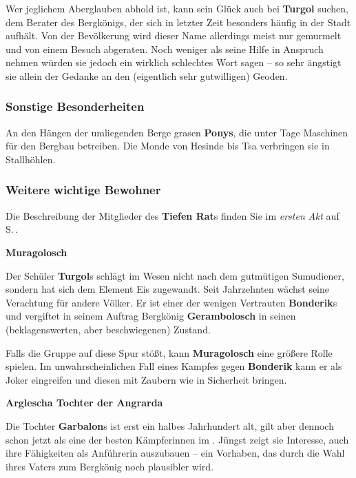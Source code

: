 Wer jeglichem Aberglauben abhold ist, kann sein Glück auch bei \textbf{Turgol} suchen, dem Berater des Bergkönigs, der sich in letzter Zeit besonders häufig in der Stadt aufhält.
Von der Bevölkerung wird dieser Name allerdings meist nur gemurmelt und von einem Besuch abgeraten.
Noch weniger als seine Hilfe in Anspruch nehmen würden sie jedoch ein wirklich schlechtes Wort sagen -- so sehr ängstigt sie allein der Gedanke an den (eigentlich sehr gutwilligen) Geoden.

\subsubsection{Sonstige Besonderheiten}
An den Hängen der umliegenden Berge grasen \textbf{Ponys}, die unter Tage Maschinen für den Bergbau betreiben. Die Monde von Hesinde bis Tsa verbringen sie in Stallhöhlen.


\subsubsection{Weitere wichtige Bewohner}

Die Beschreibung der Mitglieder des \textbf{Tiefen Rat}s finden Sie im \emph{ersten Akt} auf S.\,\pageref{rat}. 

\bigskip

\textbf{Muragolosch}

Der Schüler \textbf{Turgol}s schlägt im Wesen nicht nach dem gutmütigen Sumudiener, sondern hat sich dem Element Eis zugewandt.
Seit Jahrzehnten wächst seine Verachtung für andere Völker.
Er ist einer der wenigen Vertrauten \textbf{Bonderik}s und vergiftet in seinem Auftrag Bergkönig \textbf{Gerambolosch} in seinen (beklagenswerten, aber beschwiegenen) Zustand.

Falls die Gruppe auf diese Spur stößt, kann \textbf{Muragolosch} eine größere Rolle spielen. Im unwahrscheinlichen Fall eines Kampfes gegen \textbf{Bonderik} kann er als Joker eingreifen und diesen mit Zaubern wie  in Sicherheit bringen.

\bigskip

\textbf{Arglescha Tochter der Angrarda}

Die Tochter \textbf{Garbalon}s ist erst ein halbes Jahrhundert alt, gilt aber dennoch schon jetzt als eine der besten Kämpferinnen im \fkv.
Jüngst zeigt sie Interesse, auch ihre Fähigkeiten als Anführerin auszubauen -- ein Vorhaben, das durch die Wahl ihres Vaters zum Bergkönig noch plausibler wird.

